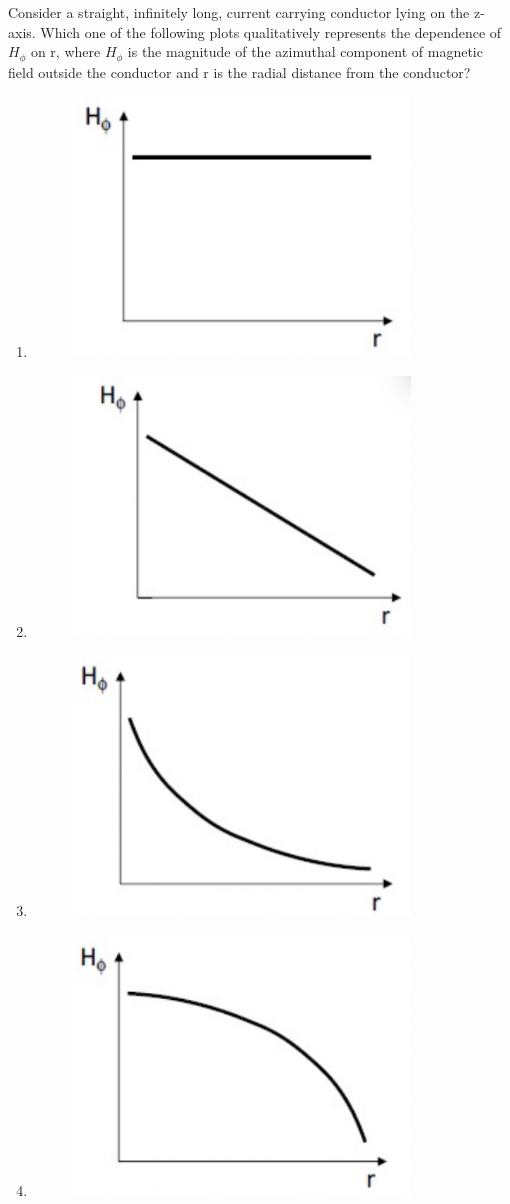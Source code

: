     \item Consider a straight, infinitely long, current carrying conductor lying on the z-axis. Which one of the following plots  qualitatively represents the dependence of $H_{\phi}$ on r, where $H_{\phi}$ is the magnitude of the azimuthal component of magnetic field outside the conductor and r is the radial distance from the conductor?
    \begin{enumerate}
        \item \begin{figure}[H]\centering\includegraphics[width=0.4\columnwidth]{figs/q34A.png}\end{figure}
        \item \begin{figure}[H]\centering\includegraphics[width=0.4\columnwidth]{figs/q34B.png}\end{figure}
        \item \begin{figure}[H]\centering\includegraphics[width=0.4\columnwidth]{figs/q34C.png}\end{figure}
        \item \begin{figure}[H]\centering\includegraphics[width=0.4\columnwidth]{figs/q34D.png}\end{figure}
    \end{enumerate}
    
